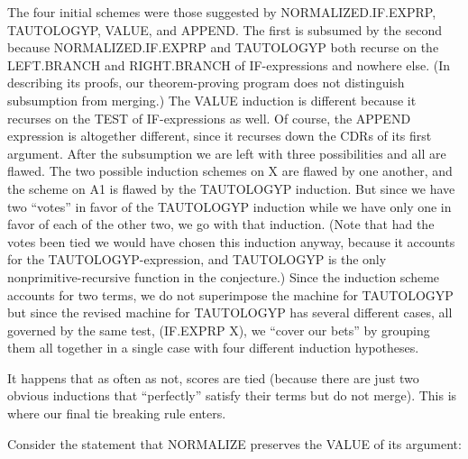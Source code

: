 \documentclass[10pt]{book}
\begin{document}
The four initial schemes were those suggested by NORMALIZED.IF.EXPRP,
TAUTOLOGYP, VALUE, and APPEND.  The first is subsumed
by the second because NORMALIZED.IF.EXPRP and TAUTOLOGYP
both recurse on the LEFT.BRANCH and RIGHT.BRANCH of
IF-expressions and nowhere else.  (In describing its
proofs, our theorem-proving program does not distinguish
subsumption from merging.)
The VALUE induction is different
because it recurses on the TEST of IF-expressions as well.  Of course,
the APPEND expression is altogether different, since it recurses down
the CDRs of its first argument.  After the subsumption we are left with
three possibilities and all are flawed.  The two possible induction schemes
on X are flawed by one another, and the scheme on A1 is flawed by the
TAUTOLOGYP induction.  But since we have two ``votes'' in favor of the TAUTOLOGYP
induction while we have only one in favor of each of the other two,
we go with that induction.  (Note that had the votes been tied we
would have chosen this induction anyway, because it accounts for
the TAUTOLOGYP-expression, and TAUTOLOGYP is the only nonprimitive-recursive
function in the conjecture.)  Since the induction scheme accounts
for two terms, we do not superimpose the machine for TAUTOLOGYP
but since the revised machine for  TAUTOLOGYP has several
different cases, all governed by the same test, (IF.EXPRP X),
we ``cover our bets'' by grouping them all together in a 
single case with four different induction hypotheses.

It happens that as often as not, scores are tied (because there
are just two obvious inductions that ``perfectly''
satisfy their terms but do not merge).  This is where our
final tie breaking rule enters.

Consider the statement that NORMALIZE preserves the
VALUE of its argument:
\end{document}
